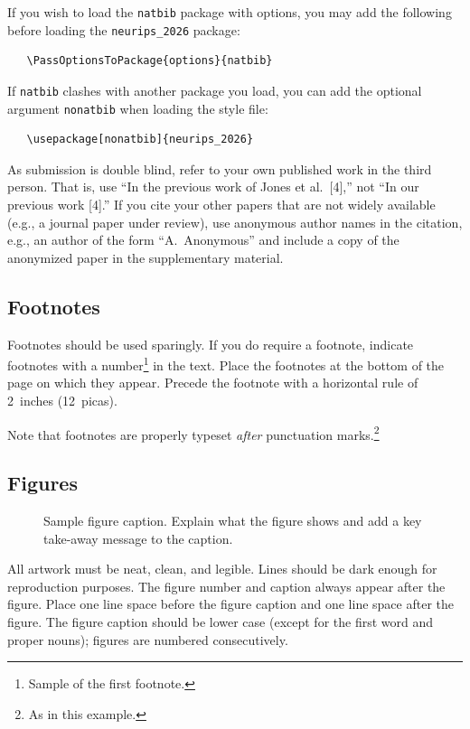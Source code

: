 \documentclass{article}
\begin{document}
If you wish to load the \verb+natbib+ package with options, you may add the
following before loading the \verb+neurips_2026+ package:
\begin{verbatim}
   \PassOptionsToPackage{options}{natbib}
\end{verbatim}


If \verb+natbib+ clashes with another package you load, you can add the optional
argument \verb+nonatbib+ when loading the style file:
\begin{verbatim}
   \usepackage[nonatbib]{neurips_2026}
\end{verbatim}


As submission is double blind, refer to your own published work in the third
person. That is, use ``In the previous work of Jones et al.\ [4],'' not ``In our
previous work [4].'' If you cite your other papers that are not widely available
(e.g., a journal paper under review), use anonymous author names in the
citation, e.g., an author of the form ``A.\ Anonymous'' and include a copy of the anonymized paper in the supplementary material.


\subsection{Footnotes}


Footnotes should be used sparingly.  If you do require a footnote, indicate
footnotes with a number\footnote{Sample of the first footnote.} in the
text. Place the footnotes at the bottom of the page on which they appear.
Precede the footnote with a horizontal rule of 2~inches (12~picas).


Note that footnotes are properly typeset \emph{after} punctuation
marks.\footnote{As in this example.}


\subsection{Figures}


\begin{figure}
  \centering
  \fbox{\rule[-.5cm]{0cm}{4cm} \rule[-.5cm]{4cm}{0cm}}
  \caption{Sample figure caption. Explain what the figure shows and add a key take-away message to the caption.}
\end{figure}


All artwork must be neat, clean, and legible. Lines should be dark enough for
 reproduction purposes. The figure number and caption always appear after the
figure. Place one line space before the figure caption and one line space after
the figure. The figure caption should be lower case (except for the first word and proper nouns); figures are numbered consecutively.
\end{document}
